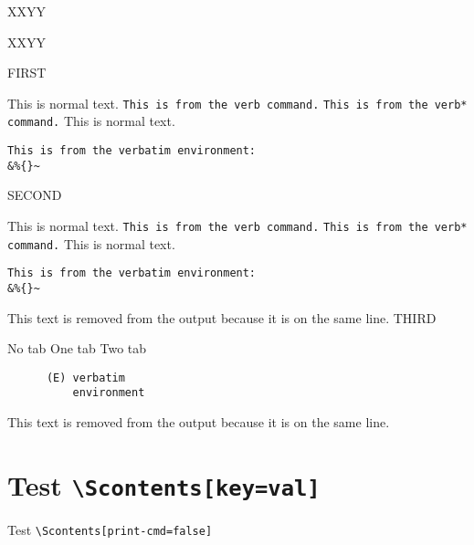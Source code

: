 \documentclass{article}
\begin{document}


XXYY\par
XXYY\par

FIRST\par
This is normal text.
\verb|This is from the verb command.|
\verb*|This is from the verb* command.|    
This is normal text.
\begin{verbatim}
This is from the verbatim environment:
&%{}~
\end{verbatim}

SECOND\par
\begin{scontents}[store-env=newattempt,print-env=true]
This is normal text.
\verb|This is from the verb command.|
\verb*|This is from the verb* command.|    
This is normal text.
\begin{verbatim}
This is from the verbatim environment:
&%{}~
\end{verbatim}
\end{scontents}This text is removed from the output because it is on the same line.
THIRD\par
\begin{scontents}[write-out=withtab.tsc]
No tab
	One tab
		Two tab
\begin{verbatim}
      (E) verbatim
          environment
\end{verbatim}
\end{scontents}This text is removed from the output because it is on the same line.

\section{Test \texttt{\textbackslash Scontents[key=val]}}

Test \verb+\Scontents[print-cmd=false]+\par

\par
\end{document}
